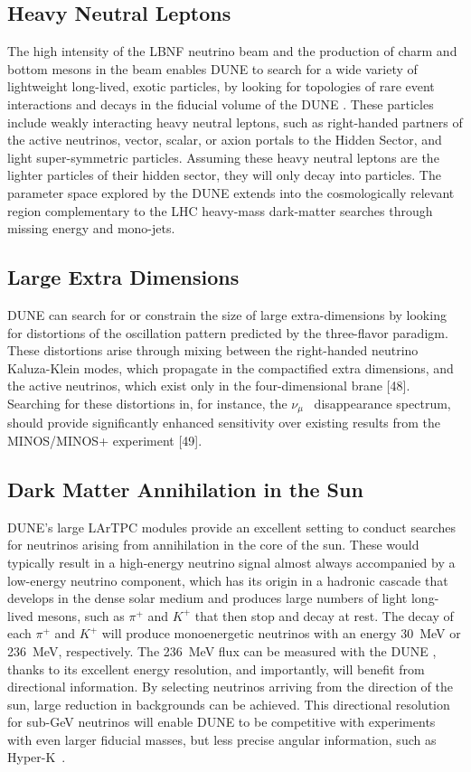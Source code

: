 \subsection{Heavy Neutral Leptons}
The high intensity of the LBNF neutrino beam and the production of charm and bottom mesons in the beam enables DUNE to search for a wide variety of lightweight long-lived, exotic particles, by looking for topologies of rare event interactions and decays in the fiducial volume of the DUNE  . These particles include weakly interacting heavy neutral leptons, such as right-handed partners of the active neutrinos, vector, scalar, or axion portals to the Hidden Sector,  
and light super-symmetric particles. Assuming these heavy neutral leptons are the lighter particles of their hidden sector, they will only decay into   particles. The parameter space explored by the DUNE   extends into the cosmologically relevant region complementary to the LHC heavy-mass dark-matter searches through missing energy and mono-jets.

\subsection{Large Extra Dimensions}
DUNE can search for or constrain the size of large extra-dimensions %
by looking for distortions of the oscillation pattern predicted by the three-flavor paradigm. These distortions arise through mixing between the right-handed neutrino Kaluza-Klein modes, which propagate in the compactified extra dimensions, and the active neutrinos, which exist only in the four-dimensional brane [48]. Searching for these distortions in, for instance, the $\nu_\mu$~ disappearance spectrum, should provide significantly enhanced sensitivity over existing results from the MINOS/MINOS+ experiment [49].

\subsection{Dark Matter Annihilation in the Sun}
DUNE's large  LArTPC modules provide an excellent setting to conduct searches for neutrinos arising from  annihilation in the core of the sun. These would typically result in a high-energy neutrino signal almost always accompanied by a low-energy neutrino component, which has its origin in a hadronic cascade that
develops in the dense solar medium and produces large numbers of light long-lived mesons, such as $\pi^+$ and $K^+$ that %
then stop and decay at rest. The decay of each $\pi^+$ and $K^+$ will
produce monoenergetic neutrinos with an energy \SI{30}{MeV} or \SI{236}{MeV}, respectively.
The  \SI{236}{MeV} flux can be measured with the DUNE , thanks to its excellent energy resolution, and importantly, will benefit from directional information. By selecting neutrinos arriving from the direction of the sun, large reduction in backgrounds can be achieved.
This directional resolution for sub-GeV neutrinos will enable DUNE to be competitive with experiments with even larger fiducial masses, but less precise angular information, such as Hyper-K~\cite{ref:DMannihilation}.

